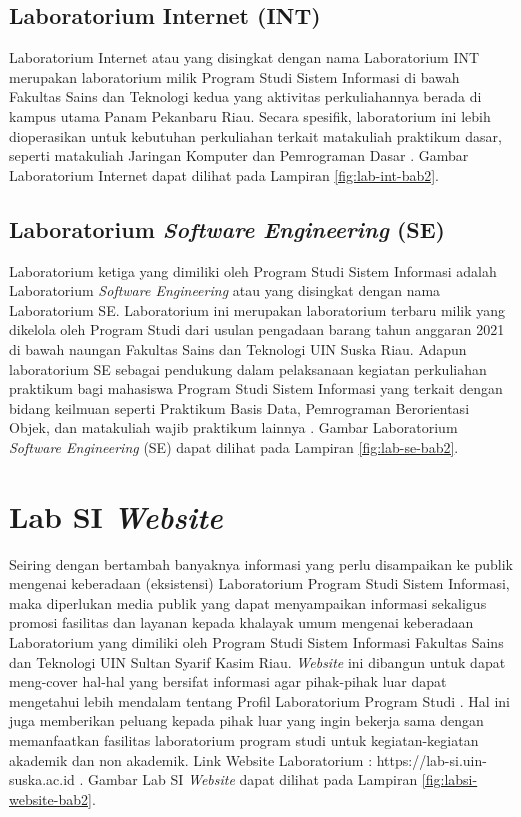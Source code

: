 \subsection{Laboratorium Internet (INT)}
Laboratorium Internet atau yang disingkat dengan nama Laboratorium INT merupakan laboratorium milik Program Studi Sistem Informasi di bawah Fakultas Sains dan Teknologi kedua yang aktivitas perkuliahannya berada di kampus utama Panam Pekanbaru Riau. Secara spesifik, laboratorium ini lebih dioperasikan untuk kebutuhan perkuliahan terkait matakuliah praktikum dasar, seperti matakuliah Jaringan Komputer dan Pemrograman Dasar \cite{labsi2023}. Gambar Laboratorium Internet dapat dilihat pada Lampiran \ref{fig:lab-int-bab2}.

\subsection{Laboratorium \textit{Software Engineering} (SE)}
Laboratorium ketiga yang dimiliki oleh Program Studi Sistem Informasi adalah Laboratorium \textit{Software Engineering} atau yang disingkat dengan nama Laboratorium SE. Laboratorium ini merupakan laboratorium terbaru milik yang dikelola oleh Program Studi dari usulan pengadaan barang tahun anggaran 2021 di bawah naungan Fakultas Sains dan Teknologi UIN Suska Riau. Adapun laboratorium SE sebagai pendukung dalam pelaksanaan kegiatan perkuliahan praktikum bagi mahasiswa Program Studi Sistem Informasi yang terkait dengan bidang keilmuan seperti Praktikum Basis Data, Pemrograman Berorientasi Objek, dan matakuliah wajib praktikum lainnya \cite{labsi2023}. Gambar Laboratorium \textit{Software Engineering} (SE) dapat dilihat pada Lampiran \ref{fig:lab-se-bab2}.

\section{Lab SI \textit{Website}}
Seiring dengan bertambah banyaknya informasi yang perlu disampaikan ke publik mengenai keberadaan (eksistensi) Laboratorium Program Studi Sistem Informasi, maka diperlukan media publik yang dapat menyampaikan informasi sekaligus promosi fasilitas dan layanan kepada khalayak umum mengenai keberadaan Laboratorium yang dimiliki oleh Program Studi Sistem Informasi Fakultas Sains dan Teknologi UIN Sultan Syarif Kasim Riau. \textit{Website} ini dibangun untuk dapat meng-cover hal-hal yang bersifat informasi agar pihak-pihak luar dapat mengetahui lebih mendalam tentang Profil Laboratorium Program Studi \cite{kusuma2024penerapan}. Hal ini juga memberikan peluang kepada pihak luar yang ingin bekerja sama dengan memanfaatkan fasilitas laboratorium program studi untuk kegiatan-kegiatan akademik dan non akademik.  Link Website Laboratorium : https://lab-si.uin-suska.ac.id \cite{web-prodi}. Gambar Lab SI \textit{Website} dapat dilihat pada Lampiran \ref{fig:labsi-website-bab2}.

